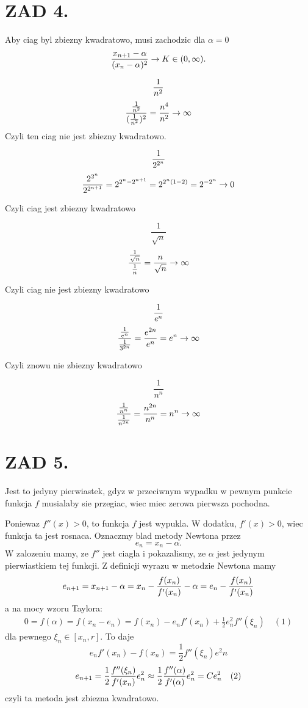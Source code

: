 \documentclass{article}[13pt]
\begin{document}
    \section*{ZAD 4.}

    Aby ciag byl zbiezny kwadratowo, musi zachodzic dla $\alpha=0$
    $${x_{n+1}-\alpha\over (x_n-\alpha)^2}\to K\in(0,\infty).$$


    $${1\over n^2}$$
    $${\frac1{n^2}\over (\frac1{n^2})^2}={n^4\over n^2}\to\infty$$
    Czyli ten ciag nie jest zbiezny kwadratowo.\medskip

    \medskip

    $${1\over2^{2^n}}$$
    $${2^{2^n}\over2^{2^{n+1}}}=2^{2^n-2^{n+1}}=2^{2^n(1-2)}=2^{-2^n}\to 0$$

    Czyli ciag jest zbiezny kwadratowo\medskip

    \medskip

    $$\frac1{\sqrt{n}}$$
    $${\frac1{\sqrt{n}}\over \frac1n}={n\over\sqrt{n}}\to\infty$$

    Czyli ciag nie jest zbiezny kwadratowo\medskip

    \medskip

    $${1\over e^n}$$
    $${{1\over e^n}\over {1\over 3^{2n}}}={e^{2n}\over e^n}=e^n\to\infty$$

    Czyli znowu nie zbiezny kwadratowo\medskip

    \medskip
    
    $$\frac1{n^n}$$
    $${\frac1{n^n}\over \frac1{n^{2n}}}={n^{2n}\over n^n}=n^n\to\infty$$


    \section*{ZAD 5.}

    Jest to jedyny pierwiastek, gdyz w przeciwnym wypadku w pewnym punkcie funkcja $f$ musialaby sie przegiac, wiec miec zerowa pierwsza pochodna.
    \medskip

    Poniewaz $f''(x)>0$, to funkcja $f$ jest wypukla. W dodatku, $f'(x)>0$, wiec funkcja ta jest rosnaca. Oznaczmy blad metody Newtona przez
    $$e_n=x_n-\alpha.$$
    W zalozeniu mamy, ze $f''$ jest ciagla i pokazalismy, ze $\alpha$ jest jedynym pierwiastkiem tej funkcji. Z definicji wyrazu w metodzie Newtona mamy
    \begin{align*}
        e_{n+1}=x_{n+1}-\alpha=x_n-{f(x_n)\over f'(x_n)}-\alpha=e_n-{f(x_n)\over f'(x_n)}
    \end{align*}
    a na mocy wzoru Taylora:
    \begin{align*}
        0=f(\alpha)=f(x_n-e_n)=f(x_n)-e_nf'(x_n)+\frac12e_n^2f''(\xi_n)\quad(1)
    \end{align*}
    dla pewnego $\xi_n\in[x_n,r]$. To daje
    $$e_nf'(x_n)-f(x_n)=\frac12f''(\xi_n)e^2n$$
    $$e_{n+1}=\frac12{f''(\xi_n)\over f'(x_n)}e_n^2\approx\frac12{f''(\alpha)\over f'(\alpha)}e_n^2=Ce^2_n\quad(2)$$
    czyli ta metoda jest zbiezna kwadratowo.
    \medskip
\end{document}
